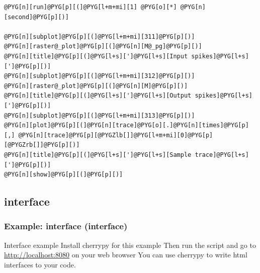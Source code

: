 \documentclass[letterpaper,10pt,english]{manual}
\begin{document}
\begin{Verbatim}[commandchars=@\[\]]
@PYG[n][run]@PYG[p][(]@PYG[l+m+mi][1] @PYG[o][*] @PYG[n][second]@PYG[p][)]

@PYG[n][subplot]@PYG[p][(]@PYG[l+m+mi][311]@PYG[p][)]
@PYG[n][raster@_plot]@PYG[p][(]@PYG[n][M@_pg]@PYG[p][)]
@PYG[n][title]@PYG[p][(]@PYG[l+s][']@PYG[l+s][Input spikes]@PYG[l+s][']@PYG[p][)]
@PYG[n][subplot]@PYG[p][(]@PYG[l+m+mi][312]@PYG[p][)]
@PYG[n][raster@_plot]@PYG[p][(]@PYG[n][M]@PYG[p][)]
@PYG[n][title]@PYG[p][(]@PYG[l+s][']@PYG[l+s][Output spikes]@PYG[l+s][']@PYG[p][)]
@PYG[n][subplot]@PYG[p][(]@PYG[l+m+mi][313]@PYG[p][)]
@PYG[n][plot]@PYG[p][(]@PYG[n][trace]@PYG[o][.]@PYG[n][times]@PYG[p][,] @PYG[n][trace]@PYG[p][@PYGZlb[]]@PYG[l+m+mi][0]@PYG[p][@PYGZrb[]]@PYG[p][)]
@PYG[n][title]@PYG[p][(]@PYG[l+s][']@PYG[l+s][Sample trace]@PYG[l+s][']@PYG[p][)]
@PYG[n][show]@PYG[p][(]@PYG[p][)]
\end{Verbatim}


\subsection{interface}

\resetcurrentobjects
\hypertarget{--doc-examples-interface_interface}{}

\hypertarget{example-interface-interface}{}\subsubsection{Example: interface (interface)}

Interface example
Install cherrypy for this example
Then run the script and go to \href{http://localhost:8080}{http://localhost:8080} on your web browser
You can use cherrypy to write html interfaces to your code.
\end{document}
